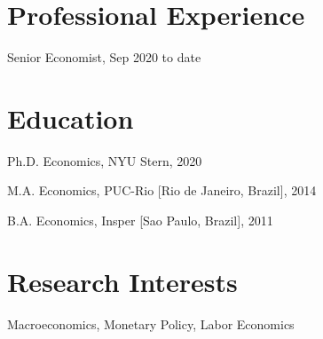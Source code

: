 \documentclass[11pt,letterpaper]{article}
\renewenvironment{itemize}{
  \begin{list}{}{
      \setlength{\leftmargin}{1.5em}
      \setlength{\itemsep}{0.25em}
      \setlength{\parskip}{0pt}
      \setlength{\parsep}{0.25em}
    }
}{
  \end{list}
}
\begin{document}
\section*{Professional Experience}
\begin{itemize}
  \item Senior Economist, Sep 2020 to date
\end{itemize}


\section*{Education}
\begin{itemize}
  \item Ph.D. Economics, NYU Stern, 2020

  \item M.A. Economics, PUC-Rio [Rio de Janeiro, Brazil], 2014

  \item B.A. Economics, Insper [Sao Paulo, Brazil], 2011
\end{itemize}

\section*{Research Interests}
Macroeconomics, Monetary Policy, Labor Economics
\end{document}
